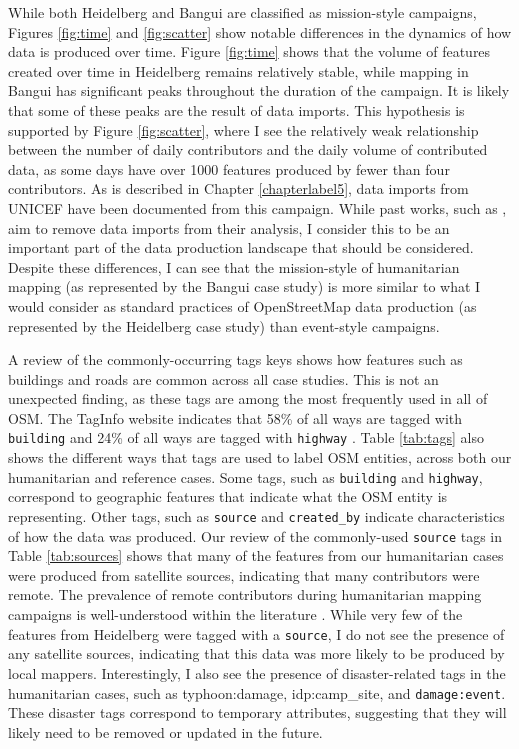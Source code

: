 While both Heidelberg and Bangui are classified as mission-style campaigns, Figures \ref{fig:time} and \ref{fig:scatter} show notable differences in the dynamics of how data is produced over time. Figure \ref{fig:time} shows that the volume of features created over time in Heidelberg remains relatively stable, while mapping in Bangui has significant peaks throughout the duration of the campaign. It is likely that some of these peaks are the result of data imports. This hypothesis is supported by Figure \ref{fig:scatter}, where I see the relatively weak relationship between the number of daily contributors and the daily volume of contributed data, as some days have over 1000 features produced by fewer than four contributors. As is described in Chapter \ref{chapterlabel5}, data imports from UNICEF have been documented from this campaign. While past works, such as \textcite{ahmouda_analyzing_2018}, aim to remove data imports from their analysis, I consider this to be an important part of the data production landscape that should be considered. Despite these differences, I can see that the mission-style of humanitarian mapping (as represented by the Bangui case study) is more similar to what I would consider as standard practices of OpenStreetMap data production (as represented by the Heidelberg case study) than event-style campaigns.

A review of the commonly-occurring tags keys shows how features such as buildings and roads are common across all case studies. This is not an unexpected finding, as these tags are among the most frequently used in all of OSM. The TagInfo website indicates that 58\% of all ways are tagged with \texttt{building} and 24\% of all ways are tagged with \texttt{highway} \parencite{noauthor_openstreetmap_2020}. Table \ref{tab:tags} also shows the different ways that tags are used to label OSM entities, across both our humanitarian and reference cases. Some tags, such as \texttt{building} and \texttt{highway}, correspond to geographic features that indicate what the OSM entity is representing. Other tags, such as \texttt{source} and \texttt{created_by} indicate characteristics of how the data was produced. Our review of the commonly-used \texttt{source} tags in Table \ref{tab:sources} shows that many of the features from our humanitarian cases were produced from satellite sources, indicating that many contributors were remote. The prevalence of remote contributors during humanitarian mapping campaigns is well-understood within the literature \parencite{dittus_mass_2017, eckle_quality_2015}. While very few of the features from Heidelberg were tagged with a \texttt{source}, I do not see the presence of any satellite sources, indicating that this data was more likely to be produced by local mappers. Interestingly, I also see the presence of disaster-related tags in the humanitarian cases, such as \texttt{}{typhoon:damage, idp:camp_site}, and \texttt{damage:event}. These disaster tags correspond to temporary attributes, suggesting that they will likely need to be removed or updated in the future. \\


